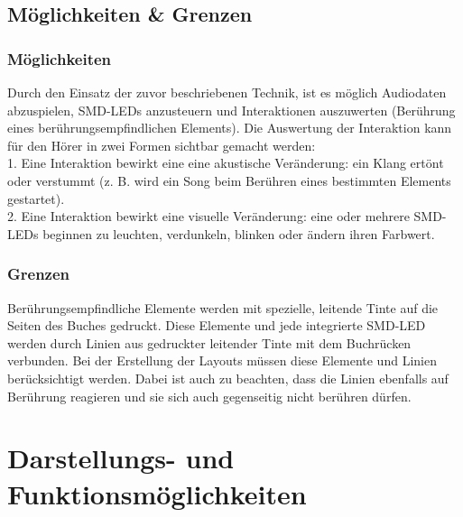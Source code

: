 \section{Möglichkeiten \& Grenzen}

\subsection{Möglichkeiten}
Durch den Einsatz der zuvor beschriebenen Technik, ist es möglich Audiodaten abzuspielen, SMD-LEDs anzusteuern und Interaktionen auszuwerten (Berührung eines berührungsempfindlichen Elements). Die Auswertung der Interaktion kann für den Hörer in zwei Formen sichtbar gemacht werden:\\
1. Eine Interaktion bewirkt eine eine akustische Veränderung: ein Klang ertönt oder verstummt (z. B. wird ein Song beim Berühren eines bestimmten Elements gestartet).\\
2. Eine Interaktion bewirkt eine visuelle Veränderung: eine oder mehrere SMD-LEDs beginnen zu leuchten, verdunkeln, blinken oder ändern ihren Farbwert.

\subsection{Grenzen}
Berührungsempfindliche Elemente werden mit spezielle, leitende Tinte auf die Seiten des Buches gedruckt. Diese Elemente und jede integrierte SMD-LED werden durch Linien aus gedruckter leitender Tinte mit dem Buchrücken verbunden. Bei der Erstellung der Layouts müssen diese Elemente und Linien berücksichtigt werden. Dabei ist auch zu beachten, dass die Linien ebenfalls auf Berührung reagieren und sie sich auch gegenseitig nicht berühren dürfen.





\chapter{Darstellungs- und Funktionsmöglichkeiten}\label{funktionen}

